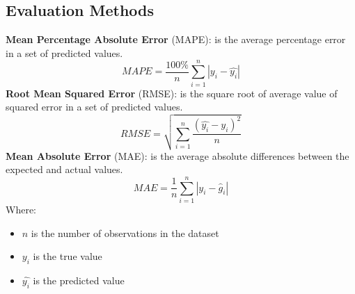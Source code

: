 \documentclass{ieeeojies}
\begin{document}
\subsection{Evaluation Methods}
\textbf{Mean Percentage Absolute Error} (MAPE): is the average percentage error in a set of predicted values\cite{Eval}.\\
\begin{equation*}
    MAPE=\frac{100\%}{n}  \sum_{i=1}^{n} |y_i-\hat{y_i} | 
\end{equation*}
\textbf{Root Mean Squared Error} (RMSE): is the square root of average value of squared error in a set of predicted values\cite{Eval}.
\begin{equation*}
    RMSE=\sqrt{\sum_{i=1}^{n} \frac{(\hat{y_i}-y_i )^2}{n} }
\end{equation*}
\textbf{Mean Absolute Error} (MAE): is the average absolute differences between the expected and actual values\cite{Eval}.
\begin{equation*}
    MAE= \frac{1}{n}\sum_{i=1}^{n}|y_i - \hat{g}_i|
\end{equation*}
Where:
\begin{itemize}
    \item \(n\) is the number of observations in the dataset
    \item \(y_i\)  is the true value
    \item \(\hat{y_i}\) is the predicted value
\end{itemize}
\end{document}
